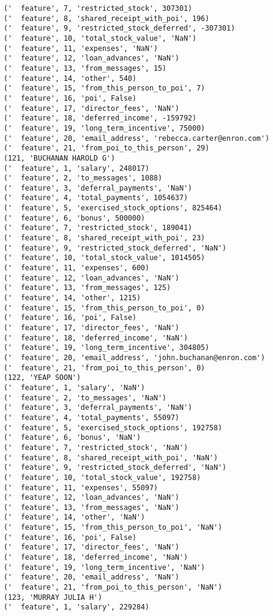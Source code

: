 \begin{verbatim}
('  feature', 7, 'restricted_stock', 307301)
('  feature', 8, 'shared_receipt_with_poi', 196)
('  feature', 9, 'restricted_stock_deferred', -307301)
('  feature', 10, 'total_stock_value', 'NaN')
('  feature', 11, 'expenses', 'NaN')
('  feature', 12, 'loan_advances', 'NaN')
('  feature', 13, 'from_messages', 15)
('  feature', 14, 'other', 540)
('  feature', 15, 'from_this_person_to_poi', 7)
('  feature', 16, 'poi', False)
('  feature', 17, 'director_fees', 'NaN')
('  feature', 18, 'deferred_income', -159792)
('  feature', 19, 'long_term_incentive', 75000)
('  feature', 20, 'email_address', 'rebecca.carter@enron.com')
('  feature', 21, 'from_poi_to_this_person', 29)
(121, 'BUCHANAN HAROLD G')
('  feature', 1, 'salary', 248017)
('  feature', 2, 'to_messages', 1088)
('  feature', 3, 'deferral_payments', 'NaN')
('  feature', 4, 'total_payments', 1054637)
('  feature', 5, 'exercised_stock_options', 825464)
('  feature', 6, 'bonus', 500000)
('  feature', 7, 'restricted_stock', 189041)
('  feature', 8, 'shared_receipt_with_poi', 23)
('  feature', 9, 'restricted_stock_deferred', 'NaN')
('  feature', 10, 'total_stock_value', 1014505)
('  feature', 11, 'expenses', 600)
('  feature', 12, 'loan_advances', 'NaN')
('  feature', 13, 'from_messages', 125)
('  feature', 14, 'other', 1215)
('  feature', 15, 'from_this_person_to_poi', 0)
('  feature', 16, 'poi', False)
('  feature', 17, 'director_fees', 'NaN')
('  feature', 18, 'deferred_income', 'NaN')
('  feature', 19, 'long_term_incentive', 304805)
('  feature', 20, 'email_address', 'john.buchanan@enron.com')
('  feature', 21, 'from_poi_to_this_person', 0)
(122, 'YEAP SOON')
('  feature', 1, 'salary', 'NaN')
('  feature', 2, 'to_messages', 'NaN')
('  feature', 3, 'deferral_payments', 'NaN')
('  feature', 4, 'total_payments', 55097)
('  feature', 5, 'exercised_stock_options', 192758)
('  feature', 6, 'bonus', 'NaN')
('  feature', 7, 'restricted_stock', 'NaN')
('  feature', 8, 'shared_receipt_with_poi', 'NaN')
('  feature', 9, 'restricted_stock_deferred', 'NaN')
('  feature', 10, 'total_stock_value', 192758)
('  feature', 11, 'expenses', 55097)
('  feature', 12, 'loan_advances', 'NaN')
('  feature', 13, 'from_messages', 'NaN')
('  feature', 14, 'other', 'NaN')
('  feature', 15, 'from_this_person_to_poi', 'NaN')
('  feature', 16, 'poi', False)
('  feature', 17, 'director_fees', 'NaN')
('  feature', 18, 'deferred_income', 'NaN')
('  feature', 19, 'long_term_incentive', 'NaN')
('  feature', 20, 'email_address', 'NaN')
('  feature', 21, 'from_poi_to_this_person', 'NaN')
(123, 'MURRAY JULIA H')
('  feature', 1, 'salary', 229284)

\end{verbatim}
